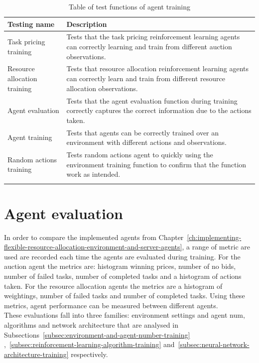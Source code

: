 \begin{longtable}{|p{3cm}|p{11cm}|} \hline
    \textbf{Testing name} & \textbf{Description} \\ \hline
    Task pricing training & Tests that the task pricing reinforcement learning agents can correctly learning and train
        from different auction observations. \\ \hline
    Resource allocation training & Tests that resource allocation reinforcement learning agents can correctly
        learn and train from different resource allocation observations. \\ \hline
    Agent evaluation & Tests that the agent evaluation function during training correctly captures the correct
        information due to the actions taken. \\ \hline
    Agent training & Tests that agents can be correctly trained over an environment with different actions and
        observations. \\ \hline
    Random actions training & Tests random actions agent to quickly using the environment training function to confirm
        that the function work as intended. \\ \hline
    \caption{Table of test functions of agent training}
    \label{tab:training_testing}
\end{longtable}

\section{Agent evaluation}\label{sec:agent-evaluation}
In order to compare the implemented agents from
Chapter~\ref{ch:implementing-flexible-resource-allocation-environment-and-server-agents}, a range of metric are
used are recorded each time the agents are evaluated during training. For the auction agent the metrics are: histogram
winning prices, number of no bids, number of failed tasks, number of completed tasks and a histogram of actions taken.
For the resource allocation agents the metrics are a histogram of weightings, number of failed tasks and number of
completed tasks. Using these metrics, agent performance can be measured between different agents. \\
These evaluations fall into three families: environment settings and agent num, algorithms and network architecture
that are analysed in Subsections~\ref{subsec:environment-and-agent-number-training}
,~\ref{subsec:reinforcement-learning-algorithm-training} and~\ref{subsec:neural-network-architecture-training}
respectively.

